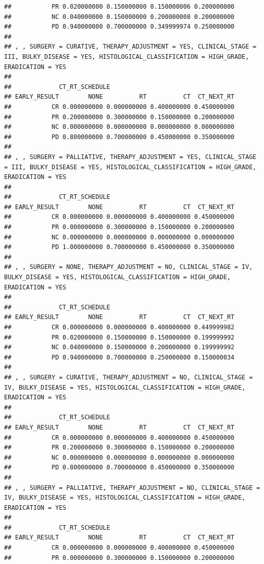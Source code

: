 \documentclass[]{article}
\begin{document}
\begin{verbatim}
##           PR 0.020000000 0.150000000 0.150000006 0.200000000
##           NC 0.040000000 0.150000000 0.200000008 0.200000000
##           PD 0.940000000 0.700000000 0.349999974 0.250000000
## 
## , , SURGERY = CURATIVE, THERAPY_ADJUSTMENT = YES, CLINICAL_STAGE = III, BULKY_DISEASE = YES, HISTOLOGICAL_CLASSIFICATION = HIGH_GRADE, ERADICATION = YES
## 
##             CT_RT_SCHEDULE
## EARLY_RESULT        NONE          RT          CT  CT_NEXT_RT
##           CR 0.000000000 0.000000000 0.400000000 0.450000000
##           PR 0.200000000 0.300000000 0.150000000 0.200000000
##           NC 0.000000000 0.000000000 0.000000000 0.000000000
##           PD 0.800000000 0.700000000 0.450000000 0.350000000
## 
## , , SURGERY = PALLIATIVE, THERAPY_ADJUSTMENT = YES, CLINICAL_STAGE = III, BULKY_DISEASE = YES, HISTOLOGICAL_CLASSIFICATION = HIGH_GRADE, ERADICATION = YES
## 
##             CT_RT_SCHEDULE
## EARLY_RESULT        NONE          RT          CT  CT_NEXT_RT
##           CR 0.000000000 0.000000000 0.400000000 0.450000000
##           PR 0.000000000 0.300000000 0.150000000 0.200000000
##           NC 0.000000000 0.000000000 0.000000000 0.000000000
##           PD 1.000000000 0.700000000 0.450000000 0.350000000
## 
## , , SURGERY = NONE, THERAPY_ADJUSTMENT = NO, CLINICAL_STAGE = IV, BULKY_DISEASE = YES, HISTOLOGICAL_CLASSIFICATION = HIGH_GRADE, ERADICATION = YES
## 
##             CT_RT_SCHEDULE
## EARLY_RESULT        NONE          RT          CT  CT_NEXT_RT
##           CR 0.000000000 0.000000000 0.400000000 0.449999982
##           PR 0.020000000 0.150000000 0.150000000 0.199999992
##           NC 0.040000000 0.150000000 0.200000000 0.199999992
##           PD 0.940000000 0.700000000 0.250000000 0.150000034
## 
## , , SURGERY = CURATIVE, THERAPY_ADJUSTMENT = NO, CLINICAL_STAGE = IV, BULKY_DISEASE = YES, HISTOLOGICAL_CLASSIFICATION = HIGH_GRADE, ERADICATION = YES
## 
##             CT_RT_SCHEDULE
## EARLY_RESULT        NONE          RT          CT  CT_NEXT_RT
##           CR 0.000000000 0.000000000 0.400000000 0.450000000
##           PR 0.200000000 0.300000000 0.150000000 0.200000000
##           NC 0.000000000 0.000000000 0.000000000 0.000000000
##           PD 0.800000000 0.700000000 0.450000000 0.350000000
## 
## , , SURGERY = PALLIATIVE, THERAPY_ADJUSTMENT = NO, CLINICAL_STAGE = IV, BULKY_DISEASE = YES, HISTOLOGICAL_CLASSIFICATION = HIGH_GRADE, ERADICATION = YES
## 
##             CT_RT_SCHEDULE
## EARLY_RESULT        NONE          RT          CT  CT_NEXT_RT
##           CR 0.000000000 0.000000000 0.400000000 0.450000000
##           PR 0.000000000 0.300000000 0.150000000 0.200000000

\end{verbatim}
\end{document}
